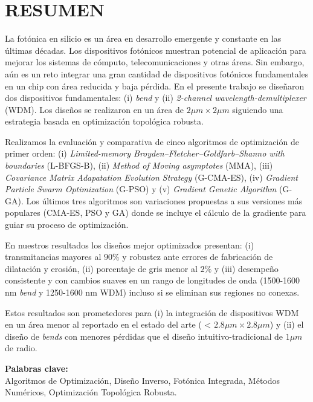\chapter*{\center \Large \vspace{-4.5cm} RESUMEN}

La fotónica en silicio es un área en desarrollo emergente y constante en las últimas décadas. Los dispositivos fotónicos muestran potencial de aplicación para mejorar
los sistemas de cómputo, telecomunicaciones y otras áreas.
Sin embargo, aún es un reto integrar una gran cantidad de dispositivos fotónicos fundamentales en un chip con área reducida y baja pérdida. 
En el presente trabajo se diseñaron dos dispositivos fundamentales: (i) \emph{bend} y (ii) \emph{2-channel wavelength-demultiplexer} (WDM).
Los diseños se realizaron en un área de $2 \mu m \times 2 \mu m$
siguiendo una estrategia basada en optimización topológica robusta.

Realizamos la evaluación y comparativa de cinco algoritmos de optimización de primer orden: 
(i) \emph{Limited-memory Broyden–Fletcher–Goldfarb–Shanno with boundaries} (L-BFGS-B), 
(ii) \emph{Method of Moving asymptotes} (MMA), 
(iii) \emph{Covariance Matrix Adapatation Evolution Strategy} (G-CMA-ES), (iv) \emph{Gradient Particle Swarm Optimization} (G-PSO) y (v) \emph{Gradient Genetic Algorithm} (G-GA). Los últimos tres algoritmos son variaciones propuestas a sus versiones
más populares (CMA-ES, PSO y GA) donde se incluye el cálculo de
la gradiente para guiar su proceso de optimización.

En nuestros resultados los diseños mejor optimizados presentan: 
(i) transmitancias mayores al $90 \%$ y robustez ante errores de fabricación de dilatación y erosión, 
(ii) porcentaje de gris menor al $2 \%$ y 
(iii) desempeño consistente y con cambios suaves en un rango de longitudes de onda (1500-1600 nm \emph{bend} y 1250-1600 nm WDM) incluso si se eliminan sus regiones no conexas. 

Estos resultados son prometedores para 
(i) la integración de dispositivos  WDM en un área menor al reportado en el estado del arte ( < $2.8 \mu m \times 2.8 \mu m$) y 
(ii) el diseño de \emph{bends} con menores pérdidas que el diseño intuitivo-tradicional de $1 \mu m$ de radio.

\noindent \textbf{Palabras clave:}\\
\noindent Algoritmos de Optimización, Diseño Inverso, Fotónica Integrada, Métodos Numéricos, Optimización Topológica Robusta.
